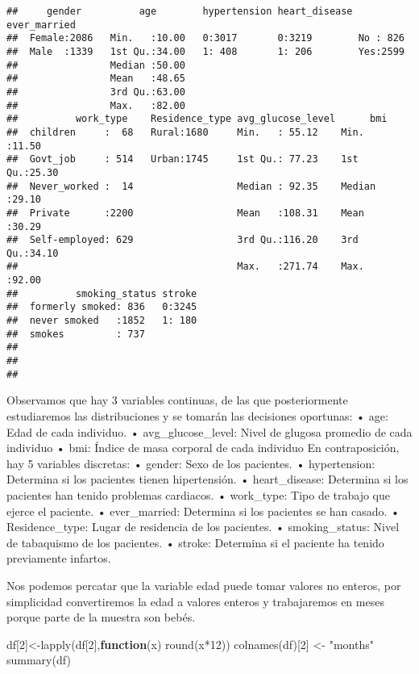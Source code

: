 \documentclass[
]{article}
\newenvironment{Shaded}{\begin{snugshade}}{\end{snugshade}}
\newcommand{\ControlFlowTok}[1]{\textcolor[rgb]{0.13,0.29,0.53}{\textbf{#1}}}
\newcommand{\DecValTok}[1]{\textcolor[rgb]{0.00,0.00,0.81}{#1}}
\newcommand{\FunctionTok}[1]{\textcolor[rgb]{0.00,0.00,0.00}{#1}}
\newcommand{\NormalTok}[1]{#1}
\newcommand{\OtherTok}[1]{\textcolor[rgb]{0.56,0.35,0.01}{#1}}
\newcommand{\SpecialCharTok}[1]{\textcolor[rgb]{0.00,0.00,0.00}{#1}}
\newcommand{\StringTok}[1]{\textcolor[rgb]{0.31,0.60,0.02}{#1}}
\begin{document}
\begin{verbatim}
##     gender          age        hypertension heart_disease ever_married
##  Female:2086   Min.   :10.00   0:3017       0:3219        No : 826    
##  Male  :1339   1st Qu.:34.00   1: 408       1: 206        Yes:2599    
##                Median :50.00                                          
##                Mean   :48.65                                          
##                3rd Qu.:63.00                                          
##                Max.   :82.00                                          
##          work_type    Residence_type avg_glucose_level      bmi       
##  children     :  68   Rural:1680     Min.   : 55.12    Min.   :11.50  
##  Govt_job     : 514   Urban:1745     1st Qu.: 77.23    1st Qu.:25.30  
##  Never_worked :  14                  Median : 92.35    Median :29.10  
##  Private      :2200                  Mean   :108.31    Mean   :30.29  
##  Self-employed: 629                  3rd Qu.:116.20    3rd Qu.:34.10  
##                                      Max.   :271.74    Max.   :92.00  
##          smoking_status stroke  
##  formerly smoked: 836   0:3245  
##  never smoked   :1852   1: 180  
##  smokes         : 737           
##                                 
##                                 
## 
\end{verbatim}

Observamos que hay 3 variables continuas, de las que posteriormente
estudiaremos las distribuciones y se tomarán las decisiones oportunas: •
age: Edad de cada individuo. • avg\_glucose\_level: Nivel de glugosa
promedio de cada individuo • bmi: Índice de masa corporal de cada
individuo En contraposición, hay 5 variables discretas: • gender: Sexo
de los pacientes. • hypertension: Determina si los pacientes tienen
hipertensión. • heart\_disease: Determina si los pacientes han tenido
problemas cardiacos. • work\_type: Tipo de trabajo que ejerce el
paciente. • ever\_married: Determina si los pacientes se han casado. •
Residence\_type: Lugar de residencia de los pacientes. •
smoking\_status: Nivel de tabaquismo de los pacientes. • stroke:
Determina si el paciente ha tenido previamente infartos.

Nos podemos percatar que la variable edad puede tomar valores no
enteros, por simplicidad convertiremos la edad a valores enteros y
trabajaremos en meses porque parte de la muestra son bebés.

\begin{Shaded}
\begin{Highlighting}[]
\NormalTok{df[}\DecValTok{2}\NormalTok{]}\OtherTok{\textless{}{-}}\FunctionTok{lapply}\NormalTok{(df[}\DecValTok{2}\NormalTok{],}\ControlFlowTok{function}\NormalTok{(x) }\FunctionTok{round}\NormalTok{(x}\SpecialCharTok{*}\DecValTok{12}\NormalTok{))}
\FunctionTok{colnames}\NormalTok{(df)[}\DecValTok{2}\NormalTok{]  }\OtherTok{\textless{}{-}} \StringTok{"months"}  
\FunctionTok{summary}\NormalTok{(df)}
\end{Highlighting}
\end{Shaded}
\end{document}
